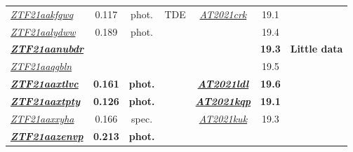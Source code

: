 \begin{table*}
\begin{tabular}{l  c  c  c   c  c  c}
    \textit{\href{https://ztfnuclear.simeonreusch.com/transient/ZTF21aakfqwq}{ZTF21aakfqwq}}          & 0.117          & phot.          & TDE                     &
    \textit{\href{https://www.wis-tns.org/object/2021crk}{AT2021crk}}                                 & 19.1           &                                                                                                                  \\
    \textit{\href{https://ztfnuclear.simeonreusch.com/transient/ZTF21aalydww}{ZTF21aalydww}}          & 0.189          & phot.          & ~                       & ~                 & 19.4                       &                      \\
    \textbf{\textit{\href{https://ztfnuclear.simeonreusch.com/transient/ZTF21aanubdr}{ZTF21aanubdr}}} & ~              & ~              & ~                       & ~                 & \textbf{19.3}              & \textbf{Little data} \\
    \textit{\href{https://ztfnuclear.simeonreusch.com/transient/ZTF21aaqgbln}{ZTF21aaqgbln}}          & ~              & ~              & ~                       & ~                 & 19.5                       &                      \\
    \textbf{\textit{\href{https://ztfnuclear.simeonreusch.com/transient/ZTF21aaxtlvc}{ZTF21aaxtlvc}}} & \textbf{0.161} & \textbf{phot.} & ~                       &
    \textbf{\textit{\href{https://www.wis-tns.org/object/2021ldl}{AT2021ldl}}}                        & \textbf{19.6 } &                                                                                                                  \\
    \textbf{\textit{\href{https://ztfnuclear.simeonreusch.com/transient/ZTF21aaxtpty}{ZTF21aaxtpty}}} & \textbf{0.126} & \textbf{phot.} & ~                       &
    \textbf{\textit{\href{https://www.wis-tns.org/object/2021kqp}{AT2021kqp}}}                        & \textbf{19.1}  &                                                                                                                  \\
    \textit{\href{https://ztfnuclear.simeonreusch.com/transient/ZTF21aaxxyha}{ZTF21aaxxyha}}          & 0.166          & spec.          & ~                       &
    \textit{\href{https://www.wis-tns.org/object/2021kuk}{AT2021kuk}}                                 & 19.3           &                                                                                                                  \\
    \textbf{\textit{\href{https://ztfnuclear.simeonreusch.com/transient/ZTF21aazenvp}{ZTF21aazenvp}}} & \textbf{0.213} & \textbf{phot.} & ~                       &

\end{tabular}
\end{table*}
